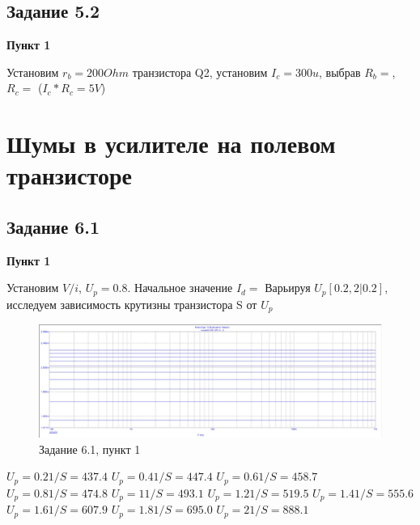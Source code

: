 \documentclass[a4paper, 14pt]{extarticle}%
\begin{document}
  	
\subsection{Задание 5.2}
\textbf{Пункт 1}
\newline

Установим $r_b = 200Ohm$ транзистора Q2, установим $I_c = 300u$, выбрав $R_b = $, $R_c = $ ($I_c*R_c = 5V$)

\section{Шумы в усилителе на полевом транзисторе}

\subsection{Задание 6.1}
\textbf{Пункт 1}
\newline

Установим ${V/i}$, $U_p = 0.8$. Начальное значение $I_d = $
\newline
Варьируя $U_p[0.2,2|0.2]$, исследуем зависимость крутизны транзистора S от $U_p$

\begin{figure}[h!]
			\centering
			\includegraphics[width=1.1\linewidth]{6/6_1_1.jpg}
			\caption{Задание 6.1, пункт 1}
			\label{A}
\end{figure}

$U_p = 0.2 1/S = 437.4$
\newline
$U_p = 0.4 1/S = 447.4$
\newline
$U_p = 0.6 1/S = 458.7$
\newline
$U_p = 0.8 1/S = 474.8$
\newline
$U_p = 1 1/S = 493.1$
\newline
$U_p = 1.2 1/S = 519.5$
\newline
$U_p = 1.4 1/S = 555.6$
\newline
$U_p = 1.6 1/S = 607.9$
\newline
$U_p = 1.8 1/S = 695.0$
\newline
$U_p = 2 1/S = 888.1$
\newline
\end{document}
